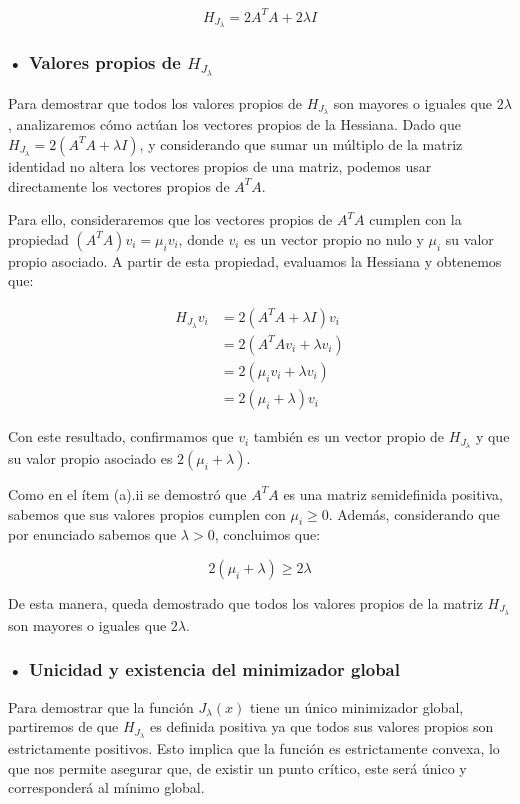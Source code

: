 \documentclass{article}
\begin{document}
\begin{enumerate}[label=\roman*., widest=iv]
  \[
  \boxed{H_{J_\lambda}=2A^TA+2\lambda I}
  \]

  \subsubsection*{• Valores propios de \(H_{J_\lambda}\)}

  Para demostrar que todos los valores propios de \(H_{J_\lambda}\) son mayores o iguales que \(2\lambda\), analizaremos cómo actúan los vectores propios de la Hessiana. Dado que \(H_{J_\lambda}=2(A^TA+\lambda I)\), y considerando que sumar un múltiplo de la matriz identidad no altera los vectores propios de una matriz, podemos usar directamente los vectores propios de \(A^TA\).

  Para ello, consideraremos que los vectores propios de \(A^TA\) cumplen con la propiedad \((A^TA)v_i=\mu_i v_i\), donde \(v_i\) es un vector propio no nulo y \(\mu_i\) su valor propio asociado. A partir de esta propiedad, evaluamos la Hessiana y obtenemos que:

  \[
  \begin{aligned}
  H_{J_\lambda}v_i
  &=2(A^TA+\lambda I)v_i\\
  &=2(A^TAv_i+\lambda v_i)\\
  &=2(\mu_i v_i+\lambda v_i)\\
  &=2(\mu_i+\lambda)v_i
  \end{aligned}
  \]

  Con este resultado, confirmamos que \(v_i\) también es un vector propio de \(H_{J_\lambda}\) y que su valor propio asociado es \(2(\mu_i+\lambda)\).

  Como en el ítem (a).ii se demostró que \(A^TA\) es una matriz semidefinida positiva, sabemos que sus valores propios cumplen con \(\mu_i\geq0\). Además, considerando que por enunciado sabemos que \(\lambda>0\), concluimos que:

  \[
  \boxed{2(\mu_i+\lambda)\geq2\lambda}
  \]

  De esta manera, queda demostrado que todos los valores propios de la matriz \(H_{J_\lambda}\) son mayores o iguales que \(2\lambda\).

  \subsubsection*{• Unicidad y existencia del minimizador global}

  Para demostrar que la función \(J_\lambda(x)\) tiene un único minimizador global, partiremos de que \(H_{J_\lambda}\) es definida positiva ya que todos sus valores propios son estrictamente positivos. Esto implica que la función es estrictamente convexa, lo que nos permite asegurar que, de existir un punto crítico, este será único y corresponderá al mínimo global.


\end{enumerate}
\end{document}
